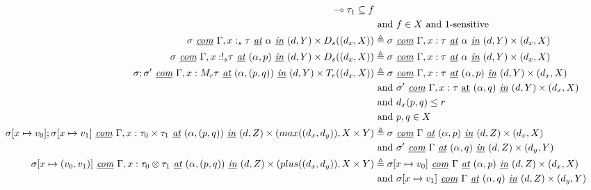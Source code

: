 \begin{definition}
\begin{tiny}
\begin{equation}
\begin{aligned}[c]
{      \multimap \tau_1} \subseteq f \\
      & \text{ and } f \in X \text{ and 1-sensitive} \\
      \sigma \textit{ \underline{com} } \Gamma, x:_s \tau \textit{ \underline{at} } \alpha \textit{ \underline{in} } (d, Y) \times D_s ((d_x, X)) &\triangleq 
      \sigma \textit{ \underline{com} } \Gamma, x : \tau \textit{ \underline{at} } \alpha \textit{ \underline{in} } (d, Y) \times (d_x, X) \\
      \sigma \textit{ \underline{com} } \Gamma, x: !_s \tau \textit{ \underline{at} } (\alpha, p) \textit{ \underline{in} } (d, Y) \times D_s ((d_x, X)) &\triangleq 
      \sigma \textit{ \underline{com} } \Gamma, x : \tau \textit{ \underline{at} } \alpha \textit{ \underline{in} } (d, Y) \times (d_x, X) \\
      \sigma; \sigma' \textit{ \underline{com} } \Gamma, x: M_r \tau \textit{ \underline{at} } (\alpha, (p, q)) \textit{ \underline{in} } (d, Y) \times T_r ((d_x, X)) &\triangleq 
      \sigma \textit{ \underline{com} } \Gamma, x : \tau \textit{ \underline{at} } (\alpha, p) \textit{ \underline{in} } (d, Y) \times (d_x, X) \\
      & \text{ and } \sigma' \textit{ \underline{com} } \Gamma, x : \tau \text{ \underline{at} } (\alpha, q) \textit{ \underline{in} } (d, Y) \times (d_x, X) \\
      & \text{ and } d_x (p, q) \leq r \\
      & \text{ and } p, q \in X \\
      \sigma[x \mapsto v_0];\sigma[x \mapsto v_1] \textit{ \underline{com} }
      \Gamma, x : \tau_0 \times \tau_1 \textit{ \underline{at} } (\alpha, (p,
      q)) \textit{ \underline{in} } (d, Z) \times (max((d_x, d_y)), X
      \times Y) &\triangleq
      \sigma \textit{ \underline{com} } \Gamma \textit{
        \underline{at} } (\alpha, p) \textit{ \underline{in} } (d, Z) \times
      (d_x, X) \\
      & \text{ and } \sigma' \textit{ \underline{com} } \Gamma \textit{
        \underline{at} } (\alpha, q) \textit{ \underline{in} } (d, Z) \times (d_y, Y)
      \\
      \sigma[x \mapsto (v_0, v_1)] \textit{ \underline{com} }
      \Gamma, x : \tau_0 \otimes \tau_1 \textit{ \underline{at} } (\alpha, (p,
      q))
      \textit{ \underline{in} } (d, Z) \times (plus((d_x, d_y)), X
      \times Y) &\triangleq
      \sigma[x \mapsto v_0] \textit{ \underline{com} } \Gamma \textit{
        \underline{at} } (\alpha, p) \textit{ \underline{in} } (d, Z) \times
      (d_x, X) \\
      & \text{ and } \sigma[x \mapsto v_1] \textit{ \underline{com} } \Gamma \textit{
        \underline{at} } (\alpha, q) \textit{ \underline{in} } (d, Z) \times (d_y, Y)
      \\
    \end{aligned}
  \end{equation}
  \end{tiny}
\end{definition}


